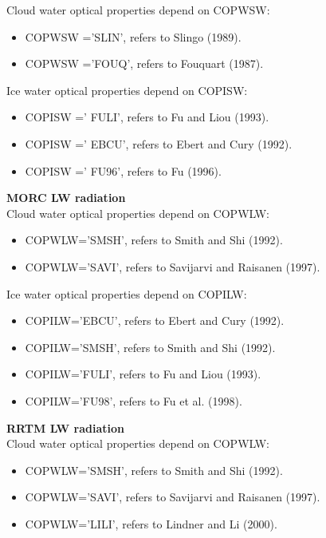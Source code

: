 Cloud water optical properties depend on COPWSW:

\begin{itemize}

\item COPWSW ='SLIN', refers to Slingo (1989).

\item COPWSW ='FOUQ', refers to Fouquart (1987).

\end{itemize}

Ice water optical properties depend on COPISW:
\begin{itemize}

\item COPISW =' FULI', refers to Fu and Liou (1993).

\item COPISW =' EBCU', refers to Ebert and Cury (1992).

\item COPISW =' FU96', refers to Fu (1996).

\end{itemize}


{\bf MORC LW radiation} \\

Cloud water optical properties depend on COPWLW:
\begin{itemize}

\item COPWLW='SMSH', refers to Smith and Shi (1992).

\item COPWLW='SAVI', refers to Savijarvi and Raisanen (1997).
\end{itemize}

Ice water optical properties depend on COPILW:
\begin{itemize}
\item COPILW='EBCU', refers to Ebert and Cury (1992).

\item COPILW='SMSH', refers to Smith and Shi (1992).

\item COPILW='FULI', refers to Fu and Liou (1993).

\item COPILW='FU98', refers to Fu et al. (1998).
\end{itemize}

{\bf RRTM LW radiation} \\

Cloud water optical properties depend on COPWLW:
\begin{itemize}
\item COPWLW='SMSH', refers to Smith and Shi (1992).

\item COPWLW='SAVI', refers to Savijarvi and Raisanen (1997).

\item COPWLW='LILI', refers to Lindner and Li (2000).

\end{itemize}


